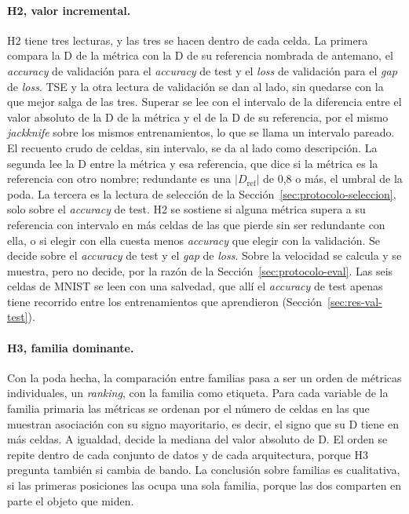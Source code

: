 \paragraph{H2, valor incremental.} H2 tiene tres lecturas, y las tres se hacen dentro de cada celda. La primera compara la D de la métrica con la D de su referencia nombrada de antemano, el \emph{accuracy} de validación para el \emph{accuracy} de test y el \emph{loss} de validación para el \emph{gap} de \emph{loss}. TSE y la otra lectura de validación se dan al lado, sin quedarse con la que mejor salga de las tres. Superar se lee con el intervalo de la diferencia entre el valor absoluto de la D de la métrica y el de la D de su referencia, por el mismo \emph{jackknife} sobre los mismos entrenamientos, lo que se llama un intervalo pareado. El recuento crudo de celdas, sin intervalo, se da al lado como descripción. La segunda lee la D entre la métrica y esa referencia, que dice si la métrica es la referencia con otro nombre; redundante es una $|D_{\mathrm{ref}}|$ de 0,8 o más, el umbral de la poda. La tercera es la lectura de selección de la Sección~\ref{sec:protocolo-seleccion}, solo sobre el \emph{accuracy} de test. H2 se sostiene si alguna métrica supera a su referencia con intervalo en más celdas de las que pierde sin ser redundante con ella, o si elegir con ella cuesta menos \emph{accuracy} que elegir con la validación. Se decide sobre el \emph{accuracy} de test y el \emph{gap} de \emph{loss}. Sobre la velocidad se calcula y se muestra, pero no decide, por la razón de la Sección~\ref{sec:protocolo-eval}. Las seis celdas de MNIST se leen con una salvedad, que allí el \emph{accuracy} de test apenas tiene recorrido entre los entrenamientos que aprendieron (Sección~\ref{sec:res-val-test}).

\paragraph{H3, familia dominante.} Con la poda hecha, la comparación entre familias pasa a ser un orden de métricas individuales, un \emph{ranking}, con la familia como etiqueta. Para cada variable de la familia primaria las métricas se ordenan por el número de celdas en las que muestran asociación con su signo mayoritario, es decir, el signo que su D tiene en más celdas. A igualdad, decide la mediana del valor absoluto de D. El orden se repite dentro de cada conjunto de datos y de cada arquitectura, porque H3 pregunta también si cambia de bando. La conclusión sobre familias es cualitativa, si las primeras posiciones las ocupa una sola familia, porque las dos comparten en parte el objeto que miden.

